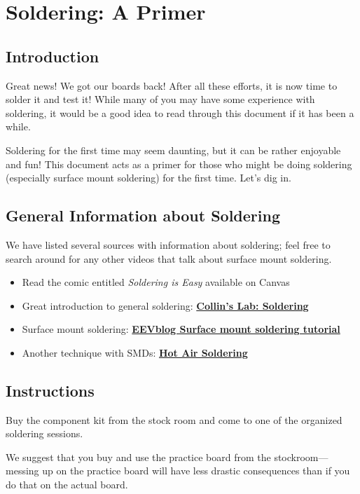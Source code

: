 \documentclass[openany,12pt,fleqn]{book} %
\begin{document}
\chapter*{Soldering: A Primer}
	
\section*{Introduction}
Great news! We got our boards back! After all these efforts, it is now time to solder it and test it! While many of you may have some experience with soldering, it would be a good idea to read through this document if it has been a while.

Soldering for the first time may seem daunting, but it can be rather enjoyable and fun! This document acts as a primer for those who might be doing soldering (especially surface mount soldering) for the first time. Let's dig in.

\section*{General Information about Soldering}
We have listed several sources with information about soldering; feel free to search around for any other videos that talk about surface mount soldering.
\begin{itemize}
	\item Read the comic entitled \textit{Soldering is Easy} available on Canvas
	\item Great introduction to general soldering: \href{https://youtu.be/QKbJxytERvg}{\textbf{Collin's Lab: Soldering}}
	\item Surface mount soldering: \href{https://youtu.be/b9FC9fAlfQE}{\textbf{EEVblog Surface mount soldering tutorial}}
	\item Another technique with SMDs: \href{https://youtu.be/0XENpPtisnM}{\textbf{Hot Air Soldering}}
\end{itemize}

\section*{Instructions}
Buy the component kit from the stock room and come to one of the organized soldering sessions.

We suggest that you buy and use the practice board from the stockroom— messing up on the practice board will have less drastic consequences than if you do that on the actual board.
\end{document}
